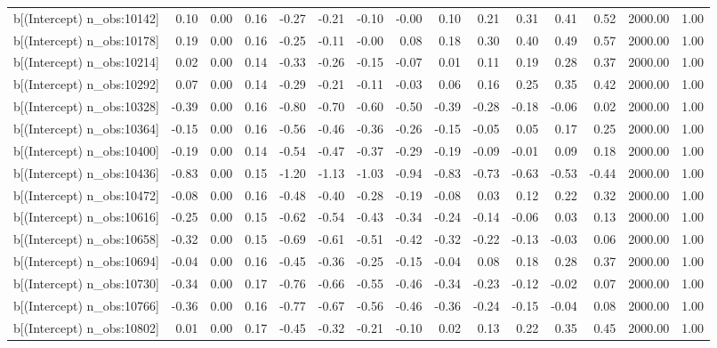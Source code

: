 \begin{table}[ht]
\begin{tabular}{rrrrrrrrrrrrrrr}
  b[(Intercept) n\_obs:10142] & 0.10 & 0.00 & 0.16 & -0.27 & -0.21 & -0.10 & -0.00 & 0.10 & 0.21 & 0.31 & 0.41 & 0.52 & 2000.00 & 1.00 \\ 
  b[(Intercept) n\_obs:10178] & 0.19 & 0.00 & 0.16 & -0.25 & -0.11 & -0.00 & 0.08 & 0.18 & 0.30 & 0.40 & 0.49 & 0.57 & 2000.00 & 1.00 \\ 
  b[(Intercept) n\_obs:10214] & 0.02 & 0.00 & 0.14 & -0.33 & -0.26 & -0.15 & -0.07 & 0.01 & 0.11 & 0.19 & 0.28 & 0.37 & 2000.00 & 1.00 \\ 
  b[(Intercept) n\_obs:10292] & 0.07 & 0.00 & 0.14 & -0.29 & -0.21 & -0.11 & -0.03 & 0.06 & 0.16 & 0.25 & 0.35 & 0.42 & 2000.00 & 1.00 \\ 
  b[(Intercept) n\_obs:10328] & -0.39 & 0.00 & 0.16 & -0.80 & -0.70 & -0.60 & -0.50 & -0.39 & -0.28 & -0.18 & -0.06 & 0.02 & 2000.00 & 1.00 \\ 
  b[(Intercept) n\_obs:10364] & -0.15 & 0.00 & 0.16 & -0.56 & -0.46 & -0.36 & -0.26 & -0.15 & -0.05 & 0.05 & 0.17 & 0.25 & 2000.00 & 1.00 \\ 
  b[(Intercept) n\_obs:10400] & -0.19 & 0.00 & 0.14 & -0.54 & -0.47 & -0.37 & -0.29 & -0.19 & -0.09 & -0.01 & 0.09 & 0.18 & 2000.00 & 1.00 \\ 
  b[(Intercept) n\_obs:10436] & -0.83 & 0.00 & 0.15 & -1.20 & -1.13 & -1.03 & -0.94 & -0.83 & -0.73 & -0.63 & -0.53 & -0.44 & 2000.00 & 1.00 \\ 
  b[(Intercept) n\_obs:10472] & -0.08 & 0.00 & 0.16 & -0.48 & -0.40 & -0.28 & -0.19 & -0.08 & 0.03 & 0.12 & 0.22 & 0.32 & 2000.00 & 1.00 \\ 
  b[(Intercept) n\_obs:10616] & -0.25 & 0.00 & 0.15 & -0.62 & -0.54 & -0.43 & -0.34 & -0.24 & -0.14 & -0.06 & 0.03 & 0.13 & 2000.00 & 1.00 \\ 
  b[(Intercept) n\_obs:10658] & -0.32 & 0.00 & 0.15 & -0.69 & -0.61 & -0.51 & -0.42 & -0.32 & -0.22 & -0.13 & -0.03 & 0.06 & 2000.00 & 1.00 \\ 
  b[(Intercept) n\_obs:10694] & -0.04 & 0.00 & 0.16 & -0.45 & -0.36 & -0.25 & -0.15 & -0.04 & 0.08 & 0.18 & 0.28 & 0.37 & 2000.00 & 1.00 \\ 
  b[(Intercept) n\_obs:10730] & -0.34 & 0.00 & 0.17 & -0.76 & -0.66 & -0.55 & -0.46 & -0.34 & -0.23 & -0.12 & -0.02 & 0.07 & 2000.00 & 1.00 \\ 
  b[(Intercept) n\_obs:10766] & -0.36 & 0.00 & 0.16 & -0.77 & -0.67 & -0.56 & -0.46 & -0.36 & -0.24 & -0.15 & -0.04 & 0.08 & 2000.00 & 1.00 \\ 
  b[(Intercept) n\_obs:10802] & 0.01 & 0.00 & 0.17 & -0.45 & -0.32 & -0.21 & -0.10 & 0.02 & 0.13 & 0.22 & 0.35 & 0.45 & 2000.00 & 1.00 \\ 

\end{tabular}
\end{table}
